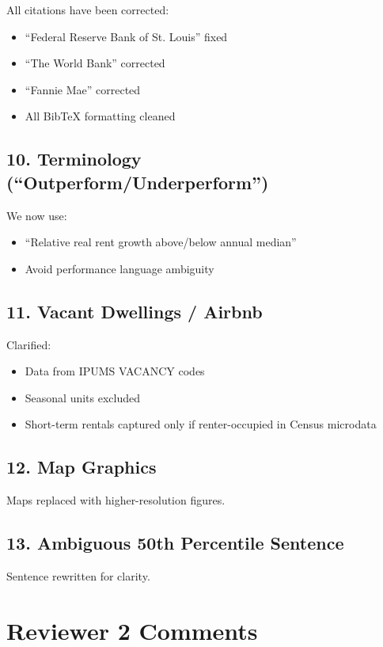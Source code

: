 \documentclass[12pt]{article}
\begin{document}
All citations have been corrected:

\begin{itemize}
\item “Federal Reserve Bank of St. Louis” fixed
\item “The World Bank” corrected
\item “Fannie Mae” corrected
\item All BibTeX formatting cleaned
\end{itemize}

\subsection*{10. Terminology (“Outperform/Underperform”)}

We now use:

\begin{itemize}
\item “Relative real rent growth above/below annual median”
\item Avoid performance language ambiguity
\end{itemize}

\subsection*{11. Vacant Dwellings / Airbnb}

Clarified:

\begin{itemize}
\item Data from IPUMS VACANCY codes
\item Seasonal units excluded
\item Short-term rentals captured only if renter-occupied in Census microdata
\end{itemize}

\subsection*{12. Map Graphics}

Maps replaced with higher-resolution figures.

\subsection*{13. Ambiguous 50th Percentile Sentence}

Sentence rewritten for clarity.

\section*{Reviewer 2 Comments}
\end{document}
